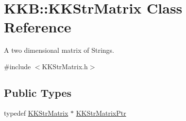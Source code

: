 \hypertarget{class_k_k_b_1_1_k_k_str_matrix}{}\section{K\+KB\+:\+:K\+K\+Str\+Matrix Class Reference}
\label{class_k_k_b_1_1_k_k_str_matrix}


A two dimensional matrix of Strings.  




{\ttfamily \#include $<$K\+K\+Str\+Matrix.\+h$>$}

\subsection*{Public Types}
\begin{DoxyCompactItemize}
\item 
typedef \hyperlink{class_k_k_b_1_1_k_k_str_matrix}{K\+K\+Str\+Matrix} $\ast$ \hyperlink{class_k_k_b_1_1_k_k_str_matrix_ab4696a54a83ee47335ddb71ae77c64ff}{K\+K\+Str\+Matrix\+Ptr}
\end{DoxyCompactItemize}
